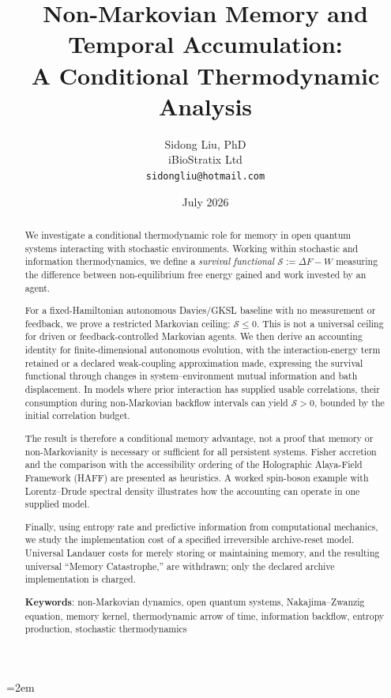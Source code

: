 \documentclass[12pt]{article}
\title{Non-Markovian Memory and Temporal Accumulation:\\
A Conditional Thermodynamic Analysis}
\author{Sidong Liu, PhD \\
\small iBioStratix Ltd \\
\small \texttt{sidongliu@hotmail.com}}
\date{July 2026}
\begin{document}
\emergencystretch=2em
\raggedbottom
{}
\maketitle

\begin{abstract}
We investigate a conditional thermodynamic role for memory in open
quantum systems interacting with stochastic environments.  Working
within stochastic and information thermodynamics, we define a
\emph{survival functional} $\mathcal{S}:=\Delta F-W$ measuring the
difference between non-equilibrium free energy gained and work invested
by an agent.

For a fixed-Hamiltonian autonomous Davies/GKSL baseline with no
measurement or feedback, we prove a restricted Markovian ceiling:
$\mathcal{S}\leq0$.  This is not a universal ceiling for driven or
feedback-controlled Markovian agents.  We then derive an accounting
identity for finite-dimensional autonomous evolution, with the
interaction-energy term retained or a declared weak-coupling
approximation made, expressing the survival functional through changes
in system--environment mutual information and bath displacement.  In
models where prior interaction has supplied usable correlations, their
consumption during non-Markovian backflow intervals can yield
$\mathcal{S}>0$, bounded by the initial correlation budget.

The result is therefore a conditional memory advantage, not a proof that
memory or non-Markovianity is necessary or sufficient for all persistent
systems.  Fisher accretion and the comparison with the accessibility
ordering of the Holographic Alaya-Field Framework (HAFF) are presented
as heuristics.  A worked spin-boson example with Lorentz--Drude spectral
density illustrates how the accounting can operate in one supplied
model.

Finally, using entropy rate and predictive information from
computational mechanics, we study the implementation cost of a specified
irreversible archive-reset model.  Universal Landauer costs for merely
storing or maintaining memory, and the resulting universal ``Memory
Catastrophe,'' are withdrawn; only the declared archive implementation
is charged.

\medskip
\noindent\textbf{Keywords}: non-Markovian dynamics, open quantum systems,
Nakajima--Zwanzig equation, memory kernel, thermodynamic arrow of time,
information backflow, entropy production, stochastic thermodynamics
\end{abstract}
\end{document}
